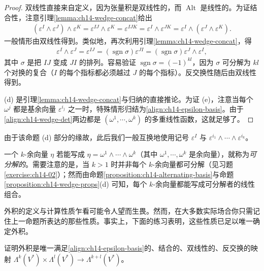 \documentclass[../../main.tex]{subfiles}
\begin{document}
\begin{proof}
双线性直接来自定义，因为张量积是双线性的，而 $\operatorname{Alt}$ 是线性的。为证结合性，注意引理\ref{lemma:ch14-wedge-concat}给出
\begin{align*}
(\varepsilon^I\wedge\varepsilon^J)\wedge\varepsilon^K=\varepsilon^{IJ}\wedge\varepsilon^K
=\varepsilon^{IJK}=\varepsilon^I\wedge\varepsilon^{JK}
=\varepsilon^I\wedge(\varepsilon^J\wedge\varepsilon^K).
\end{align*}
一般情形由双线性得到。类似地，再次利用引理\ref{lemma:ch14-wedge-concat}，得
\begin{align*}
\varepsilon^I\wedge\varepsilon^J=\varepsilon^{IJ}=(\operatorname{sgn}\sigma)\varepsilon^{JI}
=(\operatorname{sgn}\sigma)\varepsilon^J\wedge\varepsilon^I,
\end{align*}
其中 $\sigma$ 是把 $IJ$ 变成 $JI$ 的排列。容易验证 $\operatorname{sgn}\sigma=(-1)^{kl}$，因为 $\sigma$ 可分解为 $kl$ 个对换的复合（$I$ 的每个指标都必须越过 $J$ 的每个指标）。反交换性随后由双线性得到。

(d) 是引理\ref{lemma:ch14-wedge-concat}与归纳的直接推论。为证 (e)，注意当每个 $\omega^j$ 都是基余向量 $\varepsilon^{i_j}$ 之一时，特殊情形归结为\eqref{align:ch14-epsilon-basis}。由于\eqref{align:ch14-wedge-det}两边都是 $(\omega^1,\cdots ,\omega^k)$ 的多重线性函数，这就足够了。
\end{proof}

由于该命题 (d) 部分的缘故，此后我们一般互换地使用记号 $\varepsilon^I$ 与 $\varepsilon^{i_1}\wedge\cdots\wedge\varepsilon^{i_k}$。

一个 $k$-余向量 $\eta$ 若能写成 $\eta=\omega^1\wedge\cdots\wedge\omega^k$（其中 $\omega^1,\cdots ,\omega^k$ 是余向量），就称为\emph{可分解的}。需要注意的是，当 $k>1$ 时并非每个 $k$-余向量都可分解（见习题\ref{exercise:ch14-02}）；然而由命题\ref{proposition:ch14-alternating-basis}与命题\ref{proposition:ch14-wedge-props}(d) 可知，每个 $k$-余向量都能写成可分解者的线性组合。

外积的定义与计算性质乍看可能令人望而生畏。然而，在大多数实际场合你只需记住上一命题所表达的那些性质。事实上，下面的练习表明，这些性质已足以唯一确定外积。

\begin{exercise}\label{exercise:ch14-12}
证明外积是唯一满足\eqref{align:ch14-epsilon-basis}的、结合的、双线性的、反交换的映射 $\Lambda^k(V^*)\times\Lambda^l(V^*)\to\Lambda^{k+l}(V^*)$。
\end{exercise}
\end{document}
